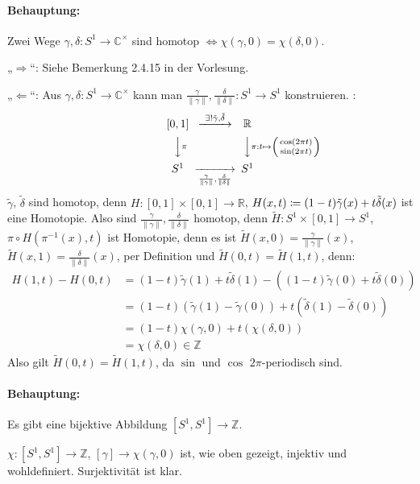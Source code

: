 \documentclass{article}
\begin{document}
\paragraph{Behauptung:} Zwei Wege $\gamma,\delta:S^1\to \mathbb C^\times$ sind homotop $\iff \chi(\gamma,0)=\chi(\delta,0)$.

„$\Longrightarrow$“: Siehe Bemerkung 2.4.15 in der Vorlesung.

„$\Longleftarrow$“: Aus $\gamma, \delta: S^1\to \mathbb C^\times$ kann man $\frac\gamma{\|\gamma\|}, \frac{\delta}{\|\delta\|}: S^1\to S^1$ konstruieren.
:
\[
\begin{CD}
[0,1] @>\exists !\tilde\gamma,\tilde\delta>> \mathbb R  \\
@VV\pi V @VV\pi: t\mapsto \left(\begin{smallmatrix}
\cos(2\pi t) \\ \sin(2\pi t)
\end{smallmatrix}\right)V \\
S^1 @>>\frac\gamma{\|\gamma\|}, \frac{\delta}{\|\delta\|}> S^1
\end{CD}
\]
$\tilde\gamma$, $\tilde\delta$ sind homotop, denn
$H:[0,1]\times[0,1] \to \mathbb R$, $H(x,t)\da (1-t)\tilde\gamma(x) + t\tilde\delta(x)$ ist eine Homotopie. Also sind $\frac\gamma{\|\gamma\|}, \frac{\delta}{\|\delta\|}$ homotop, denn $\tilde H: S^1 \times [0,1] \to S^1$, $\pi \circ H(\pi^{-1}(x),t)$ ist Homotopie, denn es ist
$\tilde H(x,0)= \frac\gamma{\|\gamma\|}(x)$, $\tilde H(x,1)= \frac\delta{\|\delta\|}(x)$, per Definition und $\tilde H(0,t) = \tilde H(1,t)$, denn:
\begin{align*}
H(1,t)-H(0,t) &= (1-t)\tilde \gamma(1) + t \tilde \delta(1) - ( (1-t)\tilde\gamma(0) + t\tilde\delta(0))\\
&= (1-t)(\tilde\gamma(1)- \tilde\gamma(0)) + t(\tilde\delta(1)- \tilde\delta(0))\\
&= (1-t)\chi(\gamma,0) + t(\chi(\delta,0))\\
&= \chi(\delta,0) \in \mathbb Z
\end{align*}
Also gilt $\tilde H(0,t) = \tilde H(1,t)$, da $\sin$ und $\cos$ $2\pi$-periodisch sind.

\paragraph{Behauptung:} Es gibt eine bijektive Abbildung $[S^1,S^1]\to \mathbb Z$.

$\chi:[S^1,S^1] \to \mathbb Z$, $[\gamma]\to \chi(\gamma,0)$ ist, wie oben gezeigt, injektiv und wohldefiniert. Surjektivität ist klar.
\end{document}

